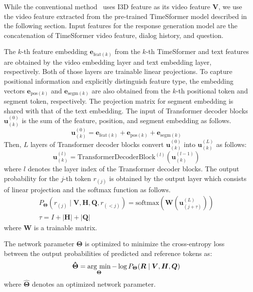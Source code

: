\documentclass[letterpaper]{article} %
\newcommand{\argmin}{\mathop{\rm arg~min}\limits}
\begin{document}
While the conventional method~\cite{Li2021bridging} uses I3D feature as its video feature $\bm{V}$, we use the video feature extracted from the pre-trained TimeSformer model described in the following section.
Input features for the response generation model are the concatenation of TimeSformer video feature, dialog history, and question.

The $k$-th feature embedding $\bm{e}_{\textrm{feat}(k)}$ from the $k$-th TimeSformer and text features are obtained by the video embedding layer and text embedding layer, respectively.
Both of those layers are trainable linear projections.
To capture positional information and explicitly distinguish feature type, the embedding vectors $\bm{e}_{\textrm{pos}(k)}$ and $\bm{e}_{\textrm{segm}(k)}$ are also obtained from the $k$-th positional token and segment token, respectively.
The projection matrix for segment embedding is shared with that of the text embedding.
The input of Transformer decoder blocks $\bm{u}_{(k)}^{(0)}$ is the sum of the feature, position, and segment embedding as follows.
\begin{equation}
  \bm{u}_{(k)}^{(0)} = \bm{e}_{\textrm{feat}(k)} + \bm{e}_{\textrm{pos}(k)} + \bm{e}_{\textrm{segm}(k)}
\end{equation}
Then, $L$ layers of Transformer decoder blocks convert $\bm{u}_{(k)}^{(0)}$ into $\bm{u}_{(k)}^{(L)}$ as follows:
\begin{equation}
  \bm{u}_{(k)}^{(l)} = \textrm{TransformerDecoderBlock}^{(l)}(\bm{u}_{(k)}^{(l-1)})
\end{equation}
where $l$ denotes the layer index of the Transformer decoder blocks.
The output probability for the $j$-th token $r_{(j)}$ is obtained by the output layer which consists of linear projection and the softmax function as follows.
\begin{gather}
  P_{\bm{\Theta}}(r_{(j)} \mid \bm{V}, \bm{H}, \bm{Q}, r_{(<j)}) = \textrm{softmax}(\bm{W}(\bm{u}_{(j+\tau)}^{(L)})) \\
  \tau = I + |\bm{H}| + |\bm{Q}|
\end{gather}
where $\bm{W}$ is a trainable matrix.

%
The network parameter $\bm{\Theta}$ is optimized to minimize the cross-entropy loss between the output probabilities of predicted and reference tokens as:
\begin{equation}
  \bm{\hat{\Theta}} = \argmin_{\bm{\Theta}}-\log P_{\bm{\Theta}}(\bm{R} \mid \bm{V}, \bm{H}, \bm{Q})
\end{equation}
where $\bm{\hat{\Theta}}$ denotes an optimized network parameter.
\end{document}
